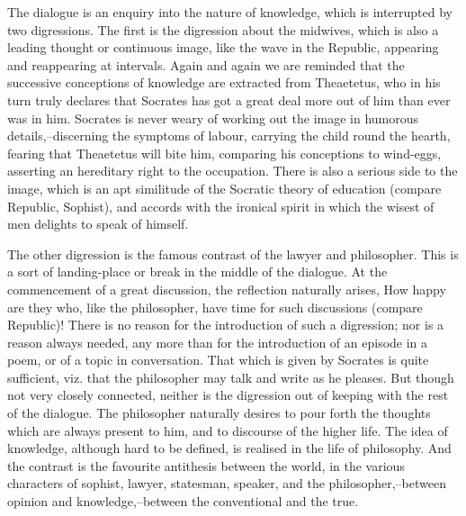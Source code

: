 The dialogue is an enquiry into the nature of knowledge, which is
interrupted by two digressions. The first is the digression about the
midwives, which is also a leading thought or continuous image, like the
wave in the Republic, appearing and reappearing at intervals. Again and
again we are reminded that the successive conceptions of knowledge are
extracted from Theaetetus, who in his turn truly declares that Socrates
has got a great deal more out of him than ever was in him. Socrates is
never weary of working out the image in humorous details,--discerning
the symptoms of labour, carrying the child round the hearth, fearing
that Theaetetus will bite him, comparing his conceptions to wind-eggs,
asserting an hereditary right to the occupation. There is also a serious
side to the image, which is an apt similitude of the Socratic theory
of education (compare Republic, Sophist), and accords with the ironical
spirit in which the wisest of men delights to speak of himself.

The other digression is the famous contrast of the lawyer and
philosopher. This is a sort of landing-place or break in the middle of
the dialogue. At the commencement of a great discussion, the reflection
naturally arises, How happy are they who, like the philosopher, have
time for such discussions (compare Republic)! There is no reason for the
introduction of such a digression; nor is a reason always needed, any
more than for the introduction of an episode in a poem, or of a topic in
conversation. That which is given by Socrates is quite sufficient, viz.
that the philosopher may talk and write as he pleases. But though not
very closely connected, neither is the digression out of keeping with
the rest of the dialogue. The philosopher naturally desires to pour
forth the thoughts which are always present to him, and to discourse of
the higher life. The idea of knowledge, although hard to be defined, is
realised in the life of philosophy. And the contrast is the favourite
antithesis between the world, in the various characters of sophist,
lawyer, statesman, speaker, and the philosopher,--between opinion and
knowledge,--between the conventional and the true.

